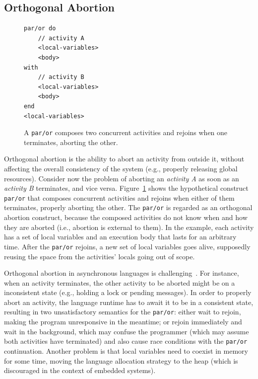 \documentclass{acm_proc_article-sp}
\newcommand{\code}[1] {{\small{\texttt{#1}}}}
\newcommand{\1}{\;}
\newcommand{\2}{\;\;}
\newcommand{\3}{\;\;\;}
\newcommand{\5}{\;\;\;\;\;}
\begin{document}
\subsection{Orthogonal Abortion}

\begin{figure}[t]
\begin{lstlisting}
par/or do
    // activity A
    <local-variables>
    <body>
with
    // activity B
    <local-variables>
    <body>
end
<local-variables>
\end{lstlisting}
\caption{ A \code{par/or} composes two concurrent activities and rejoins when 
one terminates, aborting the other.
\label{lst.abortion}
}
\end{figure}

Orthogonal abortion is the ability to abort an activity from outside it,
without affecting the overall consistency of the system (e.g., properly 
releasing global resources).
%
Consider now the problem of aborting an \emph{activity A} as soon as an
\emph{activity B} terminates, and vice versa.
%
Figure~\ref{lst.abortion} shows the hypothetical construct \code{par/or} that 
composes concurrent activities and rejoins when either of them terminates, 
properly aborting the other.
%
The \code{par/or} is regarded as an orthogonal abortion construct, because the 
composed activities do not know when and how they are aborted (i.e., abortion 
is external to them).
%
In the example, each activity has a set of local variables and an execution 
body that lasts for an arbitrary time.
After the \code{par/or} rejoins, a new set of local variables goes alive, 
supposedly reusing the space from the activities' locals going out of scope.

Orthogonal abortion in asynchronous languages is 
challenging~\cite{esterel.preemption}.
%
For instance, when an activity terminates, the other activity to be aborted 
might be on a inconsistent state (e.g., holding a lock or pending messages).
%
In order to properly abort an activity, the language runtime has to await it to 
be in a consistent state, resulting in two unsatisfactory semantics for the 
\code{par/or}:
either wait to rejoin, making the program unresponsive in the meantime;
or rejoin immediately and wait in the background, which may confuse the 
programmer (which may assume both activities have terminated) and also cause 
race conditions with the \code{par/or} continuation.
Another problem is that local variables need to coexist in memory for some 
time, moving the language allocation strategy to the heap (which is discouraged 
in the context of embedded systems).
\end{document}
